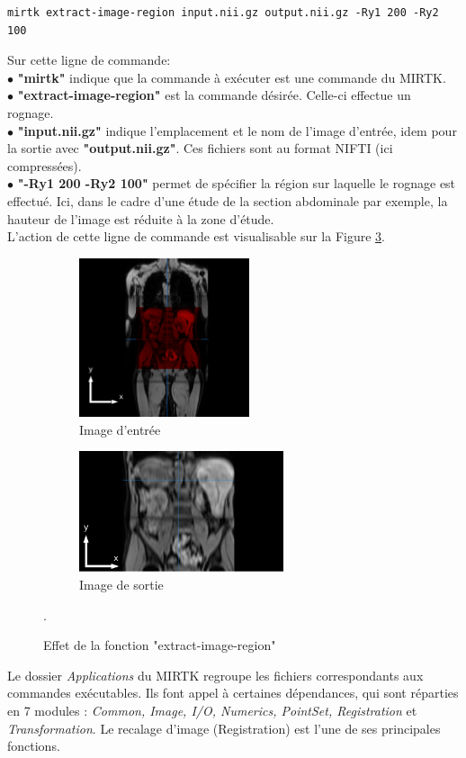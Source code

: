 \documentclass[10pt]{report}
\begin{document}
	\begin{lstlisting}
mirtk extract-image-region input.nii.gz output.nii.gz -Ry1 200 -Ry2 100
	\end{lstlisting}
	
	\noindent Sur cette ligne de commande:\\
	\t{$\bullet$} \textbf{"mirtk"} indique que la commande à exécuter est une commande du MIRTK.\\
	\t{$\bullet$} \textbf{"extract-image-region"} est la commande désirée. Celle-ci effectue un rognage.\\
	\t{$\bullet$} \textbf{"input.nii.gz"} indique l'emplacement et le nom de l'image d'entrée, idem pour la sortie avec \textbf{"output.nii.gz"}. Ces fichiers sont au format NIFTI (ici compressées).\\
	\t{$\bullet$} \textbf{"-Ry1 200 -Ry2 100"} permet de spécifier la région sur laquelle le rognage est effectué. Ici, dans le cadre d'une étude de la section abdominale par exemple, la hauteur de l'image est réduite à la zone d'étude. 
	\\L'action de cette ligne de commande est visualisable sur la Figure \ref{Effet de la fonction "extract-image-region"}.
	
	\begin{figure}[h!]
		\centering
		\begin{subfigure}{.5\textwidth}
			\centering
			\includegraphics[width=5cm]{Reports/figures/mirtkextractregion1dbis.png}
			\caption{Image d'entrée}
			\label{Image d'entrée}
		\end{subfigure}%
		\begin{subfigure}{.5\textwidth}
			\centering
			\includegraphics[width=6cm]{Reports/figures/mirtkextractregion21d.png}
			\caption{Image de sortie}
			\label{Image de sortie}
		\end{subfigure}
		\caption{Effet de la fonction "extract-image-region"}.
		\label{Effet de la fonction "extract-image-region"}
	\end{figure}	
	\vspace{-0.5cm}
	Le dossier \textit{Applications} du MIRTK regroupe les fichiers correspondants aux commandes exécutables. Ils font appel à certaines dépendances, qui sont réparties en 7 modules : \textit{Common, Image, I/O, Numerics, PointSet, Registration} et \textit{Transformation}. 
	 Le recalage d'image (Registration) est l'une de ses principales fonctions.
	
\end{document}

